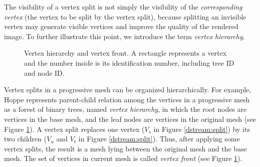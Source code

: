     The visibility of a vertex split is not simply the visibility of the \emph{corresponding
    vertex} (the vertex to be split by the vertex split), because splitting an invisible
    vertex may generate visible vertices and improve the quality of the rendered image. 
    To further illustrate this point, we introduce the term \emph{vertex hierarchy}.
    \begin{figure}
    \centering
    \caption[Vertex hierarchy and vertex front.]{Vertex hierarchy and vertex front. A rectangle represents a vertex and the number inside
    is its identification number, including tree ID and node ID.\label{dstream:hierarchy}}
    \end{figure}
    Vertex splits in a progressive mesh can be organized hierarchically.
    For example, Hoppe \cite{258843} represents
    parent-child relation among the vertices in a progressive mesh
    as a forest of binary trees, named \emph{vertex hierarchy},
    in which the root nodes are vertices in the base mesh, and
    the leaf nodes are vertices in the original mesh (see Figure \ref{dstream:hierarchy}).
    A vertex split replaces one vertex ($V_s$ in Figure \ref{dstream:split})
    by its two children ($V_u$ and $V_t$ in Figure \ref{dstream:split}).
    Thus, after applying some vertex splits,
    the result is a mesh lying between the original mesh and the base mesh.
    The set of vertices in current mesh is called \emph{vertex front}
    \cite{258843}
    (see Figure \ref{dstream:hierarchy}).%
    
